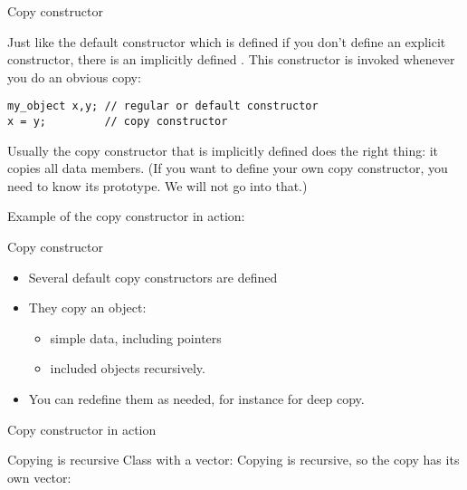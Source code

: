  {Copy constructor}

Just like the default constructor which is defined if you don't define
an explicit constructor, there is an implicitly defined
. This constructor is invoked whenever
you do an obvious copy:
\begin{lstlisting}
my_object x,y; // regular or default constructor
x = y;         // copy constructor
\end{lstlisting}
Usually the copy constructor that is implicitly defined does the right
thing: it copies all data members. (If you want to define your own copy
constructor, you need to know its prototype. We will not go into that.)

Example of the copy constructor in action:
%

\begin{slide}{Copy constructor}
  \label{sl:class-copy}
  \begin{multicols}{2}
    \begin{itemize}
    \item
      Several default copy constructors are defined
    \item They copy an object:
      \begin{itemize}
      \item simple data, including pointers
      \item included objects recursively.
      \end{itemize}
    \item You can redefine them as needed, for instance for deep copy.
    \end{itemize}
    \vfill\columnbreak
  \end{multicols}
\end{slide}

\begin{slide}{Copy constructor in action}
  \label{sl:class-copy-out}
\end{slide}

\begin{block}{Copying is recursive}
  \label{sl:class-copy-vector}
  Class with a vector:
  Copying is recursive, so the copy has its own vector:
\end{block}

